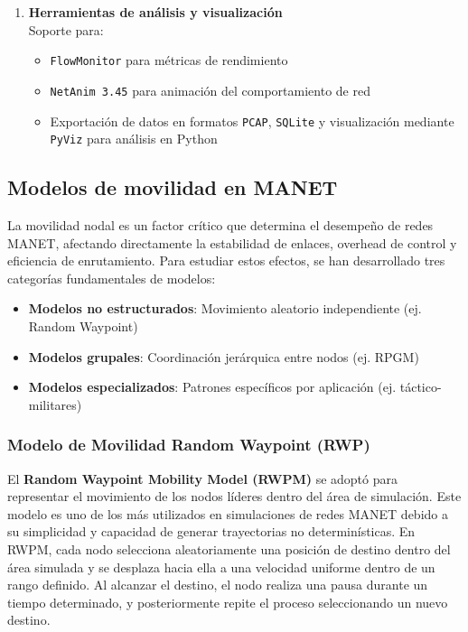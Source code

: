 \documentclass{article}
\begin{document}
\begin{enumerate}
    \item \textbf{Herramientas de análisis y visualización} \\
    Soporte para:
    \begin{itemize}
        \item \texttt{FlowMonitor} para métricas de rendimiento
        \item \texttt{NetAnim 3.45} para animación del comportamiento de red
        \item Exportación de datos en formatos \texttt{PCAP}, \texttt{SQLite} y visualización mediante \texttt{PyViz} para análisis en Python
    \end{itemize}
\end{enumerate}


\subsection{Modelos de movilidad en MANET}
La movilidad nodal es un factor crítico que determina el desempeño de redes MANET, afectando directamente la estabilidad de enlaces, overhead de control y eficiencia de enrutamiento. Para estudiar estos efectos, se han desarrollado tres categorías fundamentales de modelos:

\begin{itemize}
    \item \textbf{Modelos no estructurados}: Movimiento aleatorio independiente (ej. Random Waypoint)
    \item \textbf{Modelos grupales}: Coordinación jerárquica entre nodos (ej. RPGM)
    \item \textbf{Modelos especializados}: Patrones específicos por aplicación (ej. táctico-militares)
\end{itemize}

\subsubsection{Modelo de Movilidad Random Waypoint (RWP)}
El \textbf{Random Waypoint Mobility Model (RWPM)} se adoptó para representar el movimiento de los nodos líderes dentro del área de simulación. Este modelo es uno de los más utilizados en simulaciones de redes MANET debido a su simplicidad y capacidad de generar trayectorias no determinísticas. En RWPM, cada nodo selecciona aleatoriamente una posición de destino dentro del área simulada y se desplaza hacia ella a una velocidad uniforme dentro de un rango definido. Al alcanzar el destino, el nodo realiza una pausa durante un tiempo determinado, y posteriormente repite el proceso seleccionando un nuevo destino.
\end{document}
